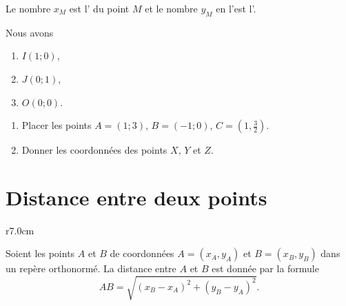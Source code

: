 \begin{Aretenir}
    Le nombre \( x_M\) est l' du point \( M\) et le nombre \( y_M\) en l'est l'.
\end{Aretenir}


Nous avons
\begin{enumerate}
    \item
       \( I(1;0)\),
   \item
       \( J(0;1)\),
   \item
       \( O(0;0)\).
\end{enumerate}


\begin{Aprojeter}

%   


\begin{center}
    
\end{center}

    \begin{enumerate}
        \item
            Placer les points \( A=(1;3)\), \( B=(-1;0)\), \( C=(1,\frac{ 3 }{2})\).
        \item
            Donner les coordonnées des points \( X\), \( Y\) et \( Z\).
    \end{enumerate}
    
\end{Aprojeter}

\section{Distance entre deux points}

\begin{Aretenir}

\begin{wrapfigure}{r}{7.0cm}
   \vspace{-1.5cm}        %
   \centering
   
\end{wrapfigure}

        Soient les points \( A\) et \( B\) de coordonnées \( A=(x_A,y_A)\) et \( B=(x_B,y_B)\) dans un repère orthonormé. La distance entre \( A\) et \( B\) est donnée par la formule
        \begin{equation*}
            AB =\sqrt{(x_B-x_A)^2+(y_B-y_A)^2}.
        \end{equation*}
    \end{Aretenir}

